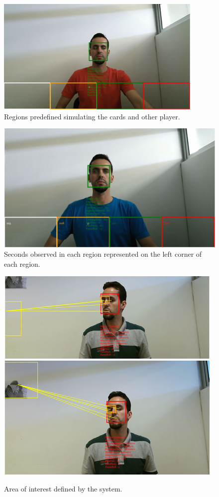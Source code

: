 \documentclass[10pt, conference]{IEEEtran}
\begin{document}
\begin{figure}[t]
	\centering
	\includegraphics{figures/pic7.png}
    \caption{Regions predefined simulating the cards and other player.}
    \label{fig:fig7}
\end{figure}

\begin{figure}[t]
	\centering
	\includegraphics{figures/pic8.png}
    \caption{Seconds observed in each region represented on the left corner of each region.}
    \label{fig:fig8}
\end{figure}

\begin{figure}[t]
	\centering
	\includegraphics{figures/pic9a.png}\\
    \includegraphics{figures/pic9b.png}\\    
    \caption{Area of interest defined by the system.}
    \label{fig:fig9}
\end{figure}
\end{document}
